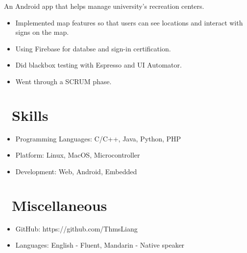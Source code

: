 \documentclass{resume}
\begin{document}
  An Android app that helps manage university’s recreation centers.
\begin{itemize}
  \item Implemented map features so that users can see locations and interact with signs on the map.
  \item Using Firebase for databse and sign-in certification.
  \item Did blackbox testing with Espresso and UI Automator.
  \item Went through a SCRUM phase.
\end{itemize}



\section{\faCogs\ Skills}
\begin{itemize}[parsep=0.5ex]
  \item Programming Languages: C/C++, Java, Python, PHP
  \item Platform: Linux, MacOS, Microcontroller
  \item Development: Web, Android, Embedded
\end{itemize}

\section{\faInfo\ Miscellaneous}
\begin{itemize}[parsep=0.5ex]
  \item GitHub: https://github.com/ThmsLiang
  \item Languages: English - Fluent, Mandarin - Native speaker
\end{itemize}

%
%
\end{document}
